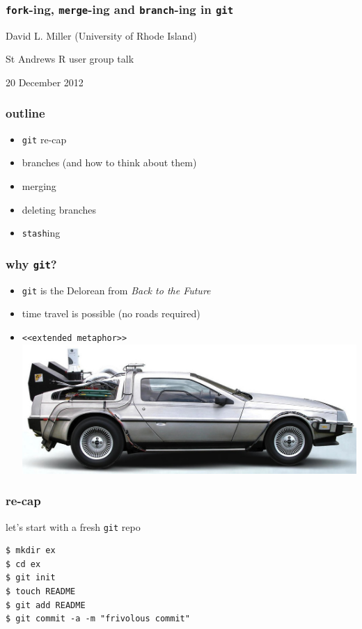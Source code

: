 \documentclass[ignorenonframetext,]{beamer}
\begin{document}
\begin{frame}\frametitle{\texttt{fork}-ing, \texttt{merge}-ing and
\texttt{branch}-ing in \texttt{git}}

David L. Miller (University of Rhode Island)

St Andrews R user group talk

20 December 2012

\end{frame}

\begin{frame}[fragile]\frametitle{outline}

\begin{itemize}[<+->]
\item
  \texttt{git} re-cap
\item
  branches (and how to think about them)
\item
  merging
\item
  deleting branches
\item
  \texttt{stash}ing
\end{itemize}

\end{frame}

\begin{frame}[fragile]\frametitle{why \texttt{git}?}

\begin{itemize}[<+->]
\item
  \texttt{git} is the Delorean from \emph{Back to the Future}
\item
  time travel is possible (no roads required)
\item
  \texttt{\textless{}\textless{}extended metaphor\textgreater{}\textgreater{}}
  \includegraphics{delorean.jpg}
\end{itemize}

\end{frame}

\begin{frame}[fragile]\frametitle{re-cap}

let's start with a fresh \texttt{git} repo

\begin{verbatim}
$ mkdir ex
$ cd ex
$ git init
$ touch README
$ git add README
$ git commit -a -m "frivolous commit"
\end{verbatim}

\end{frame}
\end{document}
